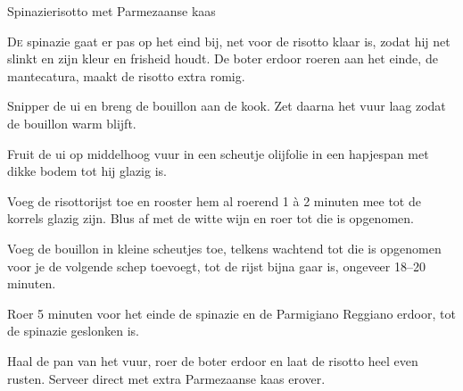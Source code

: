 \begin{recipe}{Spinazierisotto met Parmezaanse kaas}


\lettrine{D}{e} spinazie gaat er pas op het eind bij, net voor de risotto klaar
is, zodat hij net slinkt en zijn kleur en frisheid houdt. De boter erdoor
roeren aan het einde, de mantecatura, maakt de risotto extra romig.

\begin{ingredients}
\end{ingredients}

\begin{steps}
  \item Snipper de ui en breng de bouillon aan de kook. Zet daarna het vuur
        laag zodat de bouillon warm blijft.
  \item Fruit de ui op middelhoog vuur in een scheutje olijfolie in een hapjespan
        met dikke bodem tot hij glazig is.
  \item Voeg de risottorijst toe en rooster hem al roerend 1 à 2 minuten mee
        tot de korrels glazig zijn. Blus af met de witte wijn en roer tot die
        is opgenomen.
  \item Voeg de bouillon in kleine scheutjes toe, telkens wachtend tot die
        is opgenomen voor je de volgende schep toevoegt, tot de rijst bijna
        gaar is, ongeveer 18--20 minuten.
  \item Roer 5 minuten voor het einde de spinazie en de Parmigiano Reggiano
        erdoor, tot de spinazie geslonken is.
  \item Haal de pan van het vuur, roer de boter erdoor en laat de risotto
        heel even rusten. Serveer direct met extra Parmezaanse kaas erover.
\end{steps}
\end{recipe}
